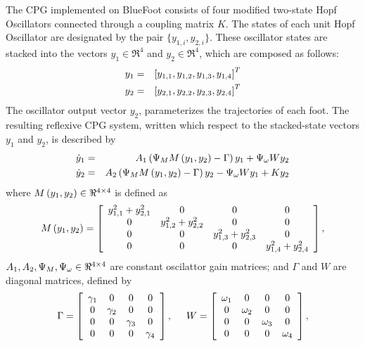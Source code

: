 		The CPG implemented on BlueFoot consists of four modified two-state Hopf Oscillators connected through a coupling matrix $K$. The states of each \Ith unit Hopf Oscillator are designated by the pair $\{y_{1,i},y_{2,i}\}$. These oscillator states are stacked into the vectors $y_{1}\in \Re^{4}$ and $y_{2}\in \Re^{4}$, which are composed as follows:
			\begin{eqnarray*}
				y_{1} &=& \left[y_{1,1},y_{1,2},y_{1,3},y_{1,4}\right]^{T}\nonumber\\
				y_{2} &=& \left[y_{2,1},y_{2,2},y_{2,3},y_{2,4}\right]^{T}
			\end{eqnarray*}
		The oscillator output vector $y_{2}$, parameterizes the trajectories of each \Ith foot. The resulting reflexive CPG system, written which respect to the stacked-state vectors $y_{1}$ and $y_{2}$, is described by
			\begin{eqnarray}
				\dot{y}_{1} &=& A_{1}\wrap{ \Psi_{M} M\wrap{y_{1},y_{2}} - \Gamma}{y}_{1} + \Psi_{\omega} W {y}_{2} 			\nonumber\\
				\dot{y}_{2} &=& A_{2}\wrap{ \Psi_{M} M\wrap{y_{1},y_{2}} - \Gamma}{y}_{2} - \Psi_{\omega} W {y}_{1} + K {y}_{2}	%
				\label{eq::cpg_ss_def}
			\end{eqnarray}
		where $M\left(y_{1},y_{2}\right) \in \Re^{4\times4}$ is defined as
			\newcommand{\yy}[1]{y_{1,#1}^{2} + y_{2,#1}^{2}}
			\begin{equation*}
				M\wrap{y_{1},y_{2}} = \left[
				\begin{array}{cccc}
				\yy{1} 	& 	0 		& 	0 		& 	0 		\\ 
				0		& 	\yy{2}  & 	0 		& 	0 		\\ 
				0 		& 	0 		& 	\yy{3}  & 	0 		\\ 
				0 		& 	0 		& 	0 		& 	\yy{4}  \\ 
				\end{array}
				\right],
			\end{equation*}
		${A_{1},A_{2}, \Psi_{M}, \Psi_{\omega}} \in\Re^{4\times4}$ are constant oscilattor gain matrices; and $\Gamma$ and $W$ are diagonal matrices, defined by
			\begin{equation*}
				\Gamma = \left[
				\begin{array}{cccc}
				\gamma_{1} 	& 	0 				& 	0 				& 	0 		\\ 
				0				& 	\gamma_{2} 	& 	0 				& 	0 		\\ 
				0 				& 	0 				& 	\gamma_{3} 	& 	0 		\\ 
				0 				& 	0 				& 	0 				& 	\gamma_{4}  \\ 
				\end{array}
				\right],
				\hspace{5mm}
				W = \left[
				\begin{array}{cccc}
				\omega_{1} 	& 	0 				& 	0 				& 	0 		\\ 
				0				& 	\omega_{2} 	& 	0 				& 	0 		\\ 
				0 				& 	0 				& 	\omega_{3} 	& 	0 		\\ 
				0 				& 	0 				& 	0 				& 	\omega_{4}  \\ 
				\end{array}
				\right],
			\end{equation*}
